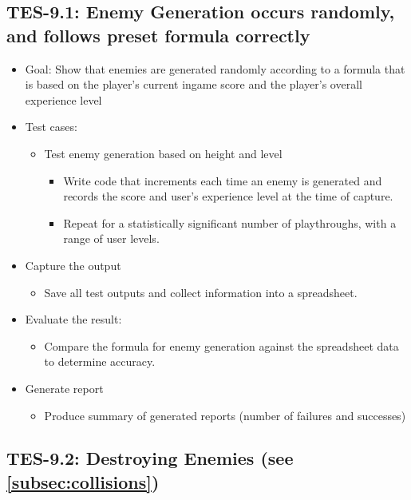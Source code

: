 \subsection{TES-9.1: Enemy Generation occurs randomly, and follows preset formula correctly }
\begin{itemize}
\item Goal: Show that enemies are generated randomly according to a formula that is based on the player's current ingame score and the player's overall experience level

\item Test cases: 
\begin{itemize}
\item Test enemy generation based on height and level
\begin{itemize}
\item Write code that increments each time an enemy is generated and records the score and user's experience
level at the time of capture.
\item Repeat for a statistically significant number of playthroughs, with a range of user levels.
\end{itemize}
\end{itemize}

\item Capture the output
\begin{itemize}
\item Save all test outputs and collect information into a spreadsheet.
\end{itemize}

\item Evaluate the result: 
\begin{itemize}
\item Compare the formula for enemy generation against the spreadsheet data to determine accuracy.
\end{itemize}

\item Generate report 
\begin{itemize}
\item Produce summary of generated reports (number of failures and successes)
\end{itemize}
\end{itemize}

\subsection{TES-9.2: Destroying Enemies (see \ref{subsec:collisions})}

